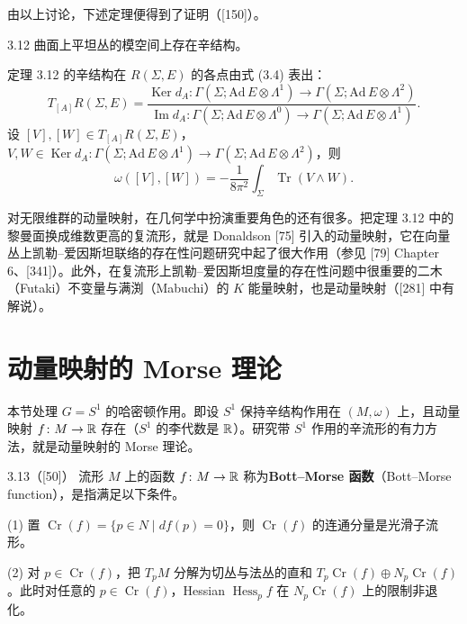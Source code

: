 由以上讨论，下述定理便得到了证明（[150]）。

\begin{theorem}{3.12}
  曲面上平坦丛的模空间上存在辛结构。
\end{theorem}

定理 3.12 的辛结构在 $R(\Sigma,E)$ 的各点由式 (3.4) 表出：
\[
  T_{[A]}R(\Sigma,E)=\frac{\operatorname{Ker}d_A\colon\Gamma(\Sigma;\mathrm{Ad}\,E\otimes\Lambda^1)\to\Gamma(\Sigma;\mathrm{Ad}\,E\otimes\Lambda^2)}
  {\operatorname{Im}d_A\colon\Gamma(\Sigma;\mathrm{Ad}\,E\otimes\Lambda^0)\to\Gamma(\Sigma;\mathrm{Ad}\,E\otimes\Lambda^1)}.
\]
设 $[V],[W]\in T_{[A]}R(\Sigma,E)$，$V,W\in\operatorname{Ker}d_A\colon\Gamma(\Sigma;\mathrm{Ad}\,E\otimes\Lambda^1)\to\Gamma(\Sigma;\mathrm{Ad}\,E\otimes\Lambda^2)$，则
\begin{equation}
  \omega([V],[W])=-\frac{1}{8\pi^2}\int_\Sigma\operatorname{Tr}(V\wedge W). \tag{3.4}
\end{equation}

对无限维群的动量映射，在几何学中扮演重要角色的还有很多。把定理 3.12 中的黎曼面换成维数更高的复流形，就是 Donaldson [75] 引入的动量映射，它在向量丛上凯勒–爱因斯坦联络的存在性问题研究中起了很大作用（参见 [79] Chapter 6、[341]）。此外，在复流形上凯勒–爱因斯坦度量的存在性问题中很重要的二木（Futaki）不变量与满渕（Mabuchi）的 $K$ 能量映射，也是动量映射（[281] 中有解说）。

\section{动量映射的 Morse 理论}


本节处理 $G=S^1$ 的哈密顿作用。即设 $S^1$ 保持辛结构作用在 $(M,\omega)$ 上，且动量映射 $f\colon M\to\mathbb{R}$ 存在（$S^1$ 的李代数是 $\mathbb{R}$）。研究带 $S^1$ 作用的辛流形的有力方法，就是动量映射的 Morse 理论。

\begin{definition}{3.13（[50]）}
  流形 $M$ 上的函数 $f\colon M\to\mathbb{R}$ 称为\textbf{Bott–Morse 函数}（Bott–Morse function），是指满足以下条件。

  (1) 置 $\operatorname{Cr}(f)=\{p\in N\mid df(p)=0\}$，则 $\operatorname{Cr}(f)$ 的连通分量是光滑子流形。

  (2) 对 $p\in\operatorname{Cr}(f)$，把 $T_pM$ 分解为切丛与法丛的直和 $T_p\operatorname{Cr}(f)\oplus N_p\operatorname{Cr}(f)$。此时对任意的 $p\in\operatorname{Cr}(f)$，Hessian $\operatorname{Hess}_pf$ 在 $N_p\operatorname{Cr}(f)$ 上的限制非退化。
\end{definition}

